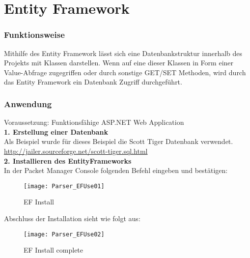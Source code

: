 \section{Entity Framework}
\label{sec:parser-entity-framework}
\subsubsection {Funktionsweise}
Mithilfe des Entity Framework lässt sich eine Datenbankstruktur innerhalb des Projekts mit Klassen darstellen. Wenn auf eine dieser Klassen in Form einer Value-Abfrage zugegriffen oder durch sonstige GET/SET Methoden, wird durch das Entity Framework ein Datenbank Zugriff durchgeführt. 
\subsubsection {Anwendung}
Voraussetzung: Funktionsfähige ASP.NET Web Application \\
\break \textbf{1. Erstellung einer Datenbank} \\
Als Beispiel wurde für dieses Beispiel die Scott Tiger Datenbank verwendet.
\break \url{http://jailer.sourceforge.net/scott-tiger.sql.html} \\
\break \textbf{2. Installieren des EntityFrameworks} \\
In der Packet Manager Console folgenden Befehl eingeben und bestätigen: 
\begin{figure}[H]
	\centering
    \texttt{[image: Parser\_EFUse01]}
    \caption{EF Install}
    \label{fig:parsef01}
\end{figure}
Abschluss der Installation sieht wie folgt aus:
\begin{figure}[H]
    \texttt{[image: Parser\_EFUse02]}
    \caption{EF Install complete}
    \label{fig:parsef02}
\end{figure} 

